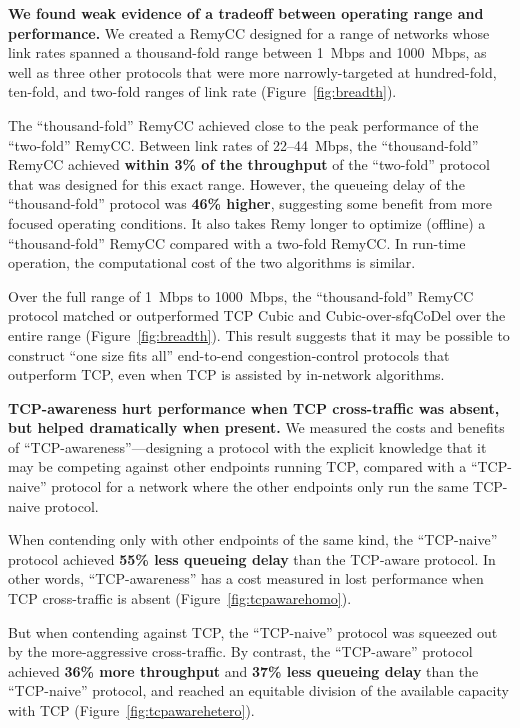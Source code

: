 \noindent 
\textbf{We found weak evidence of a tradeoff between
  operating range and performance.} We created a RemyCC designed
for a range of networks whose link rates spanned a thousand-fold range
between 1~Mbps and 1000~Mbps, as well as three other protocols that
were more narrowly-targeted at hundred-fold, ten-fold, and two-fold
ranges of link rate (Figure~\ref{fig:breadth}).

The ``thousand-fold'' RemyCC achieved close to the peak performance of
the ``two-fold'' RemyCC. Between link rates of 22--44~Mbps, the
``thousand-fold'' RemyCC achieved \textbf{within 3\% of the throughput}
of the ``two-fold'' protocol that was designed for this exact
range. However, the queueing delay of the ``thousand-fold'' protocol
was \textbf{46\% higher}, suggesting some benefit from more focused
operating conditions. It also takes Remy longer to optimize (offline)
a ``thousand-fold'' RemyCC compared with a two-fold RemyCC. In run-time
operation, the computational cost of the two algorithms is
similar.

Over the full range of 1~Mbps to 1000~Mbps, the ``thousand-fold''
RemyCC protocol matched or outperformed TCP Cubic and
Cubic-over-sfqCoDel over the entire range
(Figure~\ref{fig:breadth}). This result suggests that it may be
possible to construct ``one size fits all'' end-to-end
congestion-control protocols that outperform TCP, even when TCP is
assisted by in-network algorithms.

\vspace{\baselineskip}

\noindent \textbf{TCP-awareness hurt performance when TCP
  cross-traffic was absent, but helped dramatically when present.} We
measured the costs and benefits of ``TCP-awareness''---designing a
protocol with the explicit knowledge that it may be competing against
other endpoints running TCP, compared with a ``TCP-naive'' protocol
for a network where the other endpoints only run the same TCP-naive
protocol.

When contending only with other endpoints of the same kind, the
``TCP-naive'' protocol achieved \textbf{55\% less queueing delay} than
the TCP-aware protocol. In other words, ``TCP-awareness'' has a cost
measured in lost performance when TCP cross-traffic is absent
(Figure~\ref{fig:tcpawarehomo}).

But when contending against TCP, the ``TCP-naive'' protocol was
squeezed out by the more-aggressive cross-traffic. By contrast, the
``TCP-aware'' protocol achieved \textbf{36\% more throughput} and
\textbf{37\% less queueing delay} than the ``TCP-naive'' protocol,
and reached an equitable division of the available capacity with TCP
(Figure~\ref{fig:tcpawarehetero}).

